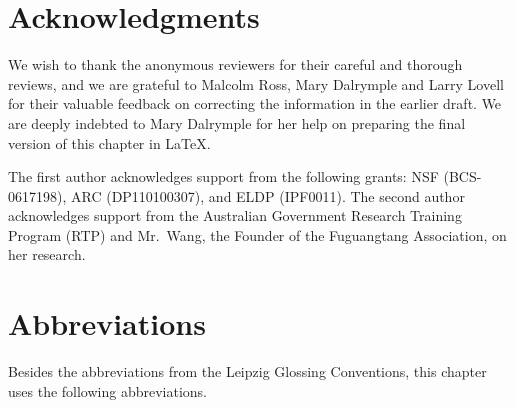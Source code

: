 \documentclass[output=paper,chinesefont]{../langscibook}
\begin{document}
\section*{Acknowledgments}

We wish to thank the anonymous reviewers for their careful and thorough reviews, and we are grateful to Malcolm Ross, Mary Dalrymple and Larry Lovell for their valuable feedback on correcting the information in the earlier draft.
We are deeply indebted to Mary Dalrymple for her help on preparing the final version of this chapter in LaTeX. 

The first author acknowledges support from the following grants:
NSF (BCS-0617198),
ARC (DP110100307),
and ELDP (IPF0011). The second author acknowledges support from the Australian Government Research Training Program (RTP) and Mr.\ Wang, the Founder of the Fuguangtang Association, on her research.

\section*{Abbreviations}

Besides the abbreviations from the Leipzig Glossing Conventions, this
chapter uses the following abbreviations. 
\medskip
\end{document}
